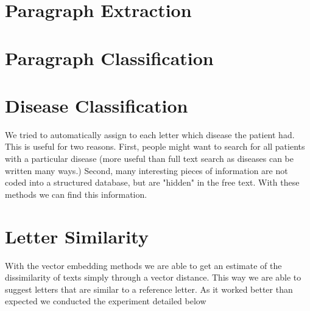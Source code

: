 %


\section{Paragraph Extraction}



\section{Paragraph Classification}



\section{Disease Classification}
We tried to automatically assign to each letter which disease the patient had. This is useful for two reasons. First, people might want to search for all patients with a particular disease (more useful than full text search as diseases can be written many ways.) Second, many interesting pieces of information are not coded into a structured database, but are "hidden" in the free text. With these methods we can find this information.

\section{Letter Similarity}
With the vector embedding methods we are able to get an estimate of the dissimilarity of texts simply through a vector distance. This way we are able to suggest letters that are similar to a reference letter. As it worked better than expected we conducted the experiment detailed below



